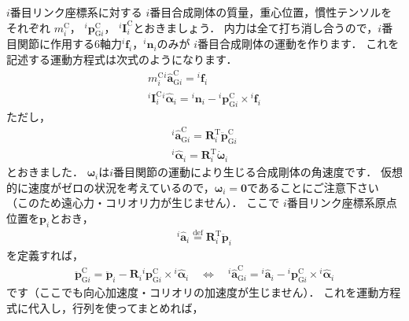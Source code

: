 \documentclass{jsarticle}
\begin{document}
$i$番目リンク座標系に対する
$i$番目合成剛体の質量，重心位置，慣性テンソルをそれぞれ
$m_{i}^{\mathrm{C}}$，
${}^{i}\bm{p}_{\mathrm{G}i}^{\mathrm{C}}$，
${}^{i}\bm{I}_{i}^{\mathrm{C}}$とおきましょう．
内力は全て打ち消し合うので，$i$番目関節に作用する6軸力${}^{i}\bm{f}_{i}$，${}^{i}\bm{n}_{i}$のみが
$i$番目合成剛体の運動を作ります．
これを記述する運動方程式は次式のようになります．
\begin{align*}
m_{i}^{\mathrm{C}}{}^{i}\hat{\bm{a}}_{\mathrm{G}i}^{\mathrm{C}}={}^{i}\bm{f}_{i}
\\
{}^{i}\bm{I}_{i}^{\mathrm{C}}{}^{i}\hat{\bm{\alpha}}_{i}={}^{i}\bm{n}_{i}-{}^{i}\bm{p}_{\mathrm{G}i}^{\mathrm{C}}\times{}^{i}\bm{f}_{i}
\end{align*}
ただし，
\begin{align*}
{}^{i}\hat{\bm{a}}_{\mathrm{G}i}^{\mathrm{C}}=\bm{R}_{i}^{\mathrm{T}}\ddot{\bm{p}}_{\mathrm{G}i}^{\mathrm{C}}
\\
{}^{i}\hat{\bm{\alpha}}_{i}=\bm{R}_{i}^{\mathrm{T}}\dot{\bm{\omega}}_{i}
\end{align*}
とおきました．
$\bm{\omega}_{i}$は$i$番目関節の運動により生じる合成剛体の角速度です．
仮想的に速度がゼロの状況を考えているので，$\bm{\omega}_{i}=\bm{0}$であることにご注意下さい
（このため遠心力・コリオリ力が生じません）．
ここで
$i$番目リンク座標系原点位置を$\bm{p}_{i}$とおき，
\begin{align*}
{}^{i}\hat{\bm{a}}_{i}\overset{\mathrm{def}}{=}\bm{R}_{i}^{\mathrm{T}}\ddot{\bm{p}}_{i}
\end{align*}
を定義すれば，
\begin{align*}
\ddot{\bm{p}}_{\mathrm{G}i}^{\mathrm{C}}=\ddot{\bm{p}}_{i}-\bm{R}_{i}{}^{i}\bm{p}_{\mathrm{G}i}^{\mathrm{C}}\times{}^{i}\hat{\bm{\alpha}}_{i}
\quad\Leftrightarrow\quad
{}^{i}\hat{\bm{a}}_{\mathrm{G}i}^{\mathrm{C}}={}^{i}\hat{\bm{a}}_{i}-{}^{i}\bm{p}_{\mathrm{G}i}^{\mathrm{C}}\times{}^{i}\hat{\bm{\alpha}}_{i}
\end{align*}
です（ここでも向心加速度・コリオリの加速度が生じません）．
これを運動方程式に代入し，行列を使ってまとめれば，
\end{document}
